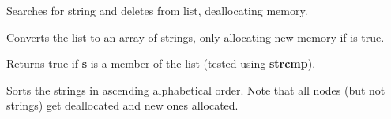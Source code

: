 Searches for string and deletes from list, deallocating memory.



Converts the list to an array of strings, only allocating new memory if
 is true.



Returns true if {\bf s} is a member of the list (tested using {\bf strcmp}).



Sorts the strings in ascending alphabetical order. Note that all nodes
(but not strings) get deallocated and new ones allocated.


